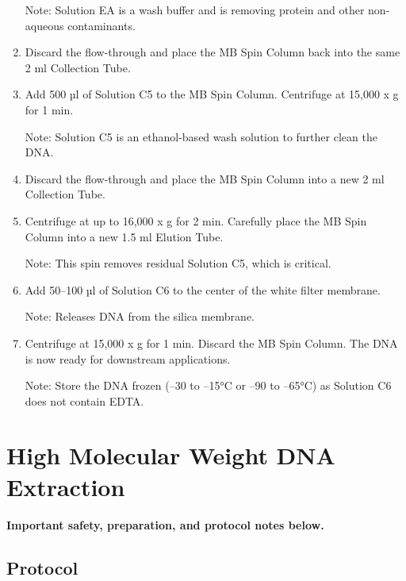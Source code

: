 \documentclass[
]{book}
\begin{document}
\begin{enumerate}
  Note: Solution EA is a wash buffer and is removing protein and other non-aqueous contaminants.
\item
  Discard the flow-through and place the MB Spin Column back into the same 2 ml Collection Tube.
\item
  Add 500 µl of Solution C5 to the MB Spin Column. Centrifuge at 15,000 x g for 1 min.

  Note: Solution C5 is an ethanol-based wash solution to further clean the DNA.
\item
  Discard the flow-through and place the MB Spin Column into a new 2 ml Collection Tube.
\item
  Centrifuge at up to 16,000 x g for 2 min. Carefully place the MB Spin Column into a new 1.5 ml Elution Tube.

  Note: This spin removes residual Solution C5, which is critical.
\item
  Add 50--100 µl of Solution C6 to the center of the white filter membrane.

  Note: Releases DNA from the silica membrane.
\item
  Centrifuge at 15,000 x g for 1 min. Discard the MB Spin Column. The DNA is now ready for downstream applications.

  Note: Store the DNA frozen (--30 to --15°C or --90 to --65°C) as Solution C6 does not contain EDTA.
\end{enumerate}

\hypertarget{high-molecular-weight-dna-extraction}{%
\chapter{High Molecular Weight DNA Extraction}\label{high-molecular-weight-dna-extraction}}

\textbf{Important safety, preparation, and protocol notes below.}

\hypertarget{protocol}{%
\section{Protocol}\label{protocol}}
\end{document}
